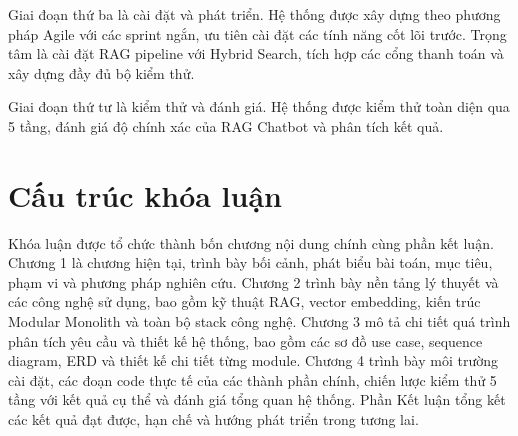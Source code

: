Giai đoạn thứ ba là cài đặt và phát triển. Hệ thống được xây dựng theo phương pháp Agile với các sprint ngắn, ưu tiên cài đặt các tính năng cốt lõi trước. Trọng tâm là cài đặt RAG pipeline với Hybrid Search, tích hợp các cổng thanh toán và xây dựng đầy đủ bộ kiểm thử.

Giai đoạn thứ tư là kiểm thử và đánh giá. Hệ thống được kiểm thử toàn diện qua 5 tầng, đánh giá độ chính xác của RAG Chatbot và phân tích kết quả.

\section{Cấu trúc khóa luận}

Khóa luận được tổ chức thành bốn chương nội dung chính cùng phần kết luận. Chương 1 là chương hiện tại, trình bày bối cảnh, phát biểu bài toán, mục tiêu, phạm vi và phương pháp nghiên cứu. Chương 2 trình bày nền tảng lý thuyết và các công nghệ sử dụng, bao gồm kỹ thuật RAG, vector embedding, kiến trúc Modular Monolith và toàn bộ stack công nghệ. Chương 3 mô tả chi tiết quá trình phân tích yêu cầu và thiết kế hệ thống, bao gồm các sơ đồ use case, sequence diagram, ERD và thiết kế chi tiết từng module. Chương 4 trình bày môi trường cài đặt, các đoạn code thực tế của các thành phần chính, chiến lược kiểm thử 5 tầng với kết quả cụ thể và đánh giá tổng quan hệ thống. Phần Kết luận tổng kết các kết quả đạt được, hạn chế và hướng phát triển trong tương lai.
